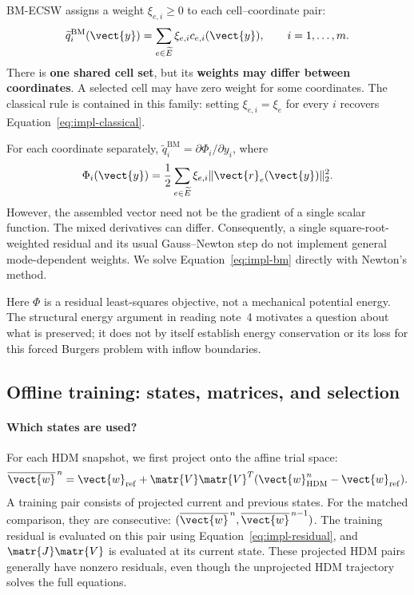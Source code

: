 BM-ECSW assigns a weight $\xi_{e,i}\geq0$ to each cell--coordinate pair:
\begin{equation}
 \widetilde q_i^{\mathrm{BM}}(\vect{y})
 =\sum_{e\in\widetilde E}\xi_{e,i}c_{e,i}(\vect{y}),
 \qquad i=1,\ldots,m.
 \label{eq:impl-bm}
\end{equation}
There is \textbf{one shared cell set}, but its \textbf{weights may differ between coordinates}. A selected cell may have zero weight for some coordinates. The classical rule is contained in this family: setting $\xi_{e,i}=\xi_e$ for every $i$ recovers Equation~\eqref{eq:impl-classical}.

For each coordinate separately, $\widetilde q_i^{\mathrm{BM}}=\partial\Phi_i/\partial y_i$, where
\begin{equation}
 \Phi_i(\vect{y})=\frac12\sum_{e\in\widetilde E}\xi_{e,i}\|\vect{r}_e(\vect{y})\|_2^2.
\end{equation}
However, the assembled vector need not be the gradient of a single scalar function. The mixed derivatives can differ. Consequently, a single square-root-weighted residual and its usual Gauss--Newton step do not implement general mode-dependent weights. We solve Equation~\eqref{eq:impl-bm} directly with Newton's method.

Here $\Phi$ is a residual least-squares objective, not a mechanical potential energy. The structural energy argument in reading note~4 motivates a question about what is preserved; it does not by itself establish energy conservation or its loss for this forced Burgers problem with inflow boundaries.

\subsection{Offline training: states, matrices, and selection}
\label{sec:impl-training}

\paragraph{Which states are used?}
For each HDM snapshot, we first project onto the affine trial space:
\begin{equation}
 \overline{\vect{w}}^{\,n}
 =\vect{w}_{\mathrm{ref}}+\matr{V}\matr{V}^T(\vect{w}_{\mathrm{HDM}}^n-\vect{w}_{\mathrm{ref}}).
 \label{eq:impl-projection}
\end{equation}
A training pair consists of projected current and previous states. For the matched comparison, they are consecutive: $(\overline{\vect{w}}^{\,n},\overline{\vect{w}}^{\,n-1})$. The training residual is evaluated on this pair using Equation~\eqref{eq:impl-residual}, and $\matr{J}\matr{V}$ is evaluated at its current state. These projected HDM pairs generally have nonzero residuals, even though the unprojected HDM trajectory solves the full equations.


